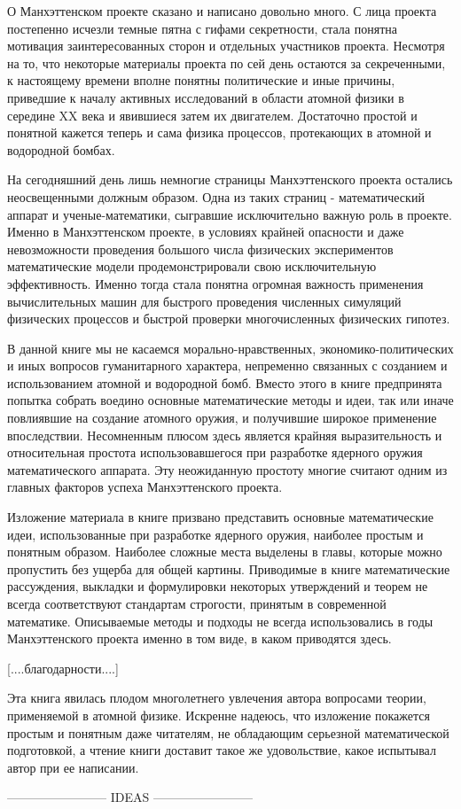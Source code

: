 О Манхэттенском проекте сказано и написано довольно много.
С лица проекта постепенно исчезли темные пятна с гифами секретности, стала понятна мотивация заинтересованных сторон и отдельных участников проекта.
Несмотря на то, что некоторые материалы проекта по сей день остаются за секреченными, к настоящему времени вполне понятны политические и иные причины, приведшие к началу активных исследований в области атомной физики в середине XX века и явившиеся затем их двигателем.
Достаточно простой и понятной кажется теперь и сама физика процессов, протекающих в атомной и водородной бомбах.

На сегодняшний день лишь немногие страницы Манхэттенского проекта остались неосвещенными должным образом. 
Одна из таких страниц - математический аппарат и ученые-математики, сыгравшие исключительно важную роль в проекте.
Именно в Манхэттенском проекте, в условиях крайней опасности и даже невозможности проведения большого числа физических экспериментов математические модели продемонстрировали свою исключительную эффективность.
Именно тогда стала понятна огромная важность применения вычислительных машин для быстрого проведения численных симуляций физических процессов и быстрой проверки многочисленных физических гипотез.

В данной книге мы не касаемся морально-нравственных, экономико-политических и иных вопросов гуманитарного характера, непременно связанных с созданием и использованием атомной и водородной бомб.
Вместо этого в книге предпринята попытка собрать воедино основные математические методы и идеи, так или иначе повлиявшие на создание атомного оружия, и получившие широкое применение впоследствии.
Несомненным плюсом здесь является крайняя выразительность и относительная простота использовавшегося при разработке ядерного оружия математического аппарата. 
Эту неожиданную простоту многие считают одним из главных факторов успеха Манхэттенского проекта.

Изложение материала в книге призвано представить основные математические идеи, использованные при разработке ядерного оружия, наиболее простым и понятным образом. 
Наиболее сложные места выделены в главы, которые можно пропустить без ущерба для общей картины.
Приводимые в книге математические рассуждения, выкладки и формулировки некоторых утверждений и теорем не всегда соответствуют стандартам строгости, принятым в современной математике.
Описываемые методы и подходы не всегда использовались в годы Манхэттенского проекта именно в том виде, в каком приводятся здесь.

[....благодарности....]

Эта книга явилась плодом многолетнего увлечения автора вопросами теории, применяемой в атомной физике. 
Искренне надеюсь, что изложение покажется простым и понятным даже читателям, не обладающим серьезной математической подготовкой, а чтение книги доставит такое же удовольствие, какое испытывал автор при ее написании.


------------------------ IDEAS ------------------------ 











